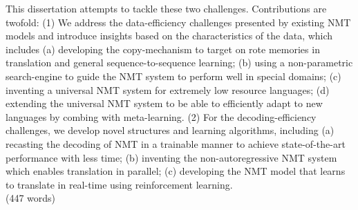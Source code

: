 This dissertation attempts to tackle these two challenges.
Contributions are twofold: 
(1) We address the data-efficiency challenges presented by existing NMT models and introduce insights based on the characteristics of the data, which includes 
(a) developing the copy-mechanism to target on rote memories in translation and general sequence-to-sequence learning; 
(b) using a non-parametric search-engine to guide the NMT system to perform well in special domains; 
(c) inventing a universal NMT system for extremely low resource languages; 
(d) extending the universal NMT system to be able to efficiently adapt to new languages by combing with meta-learning.
(2) For the decoding-efficiency challenges, we develop novel structures and learning algorithms, including
(a) recasting the decoding of NMT in a trainable manner to achieve state-of-the-art performance with less time; 
(b) inventing the non-autoregressive NMT system which enables translation in parallel; 
(c) developing the NMT model that learns to translate in real-time using reinforcement learning.\\
(447 words)

%
%
%
